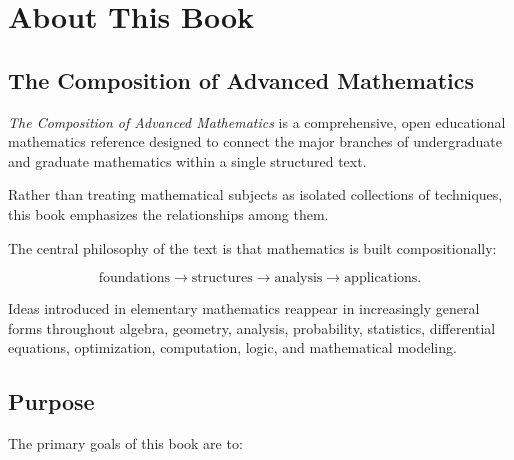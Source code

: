 
\cleardoublepage

\chapter*{About This Book}
\label{chap:about-this-book}



\section*{The Composition of Advanced Mathematics}

\emph{The Composition of Advanced Mathematics} is a comprehensive,
open educational mathematics reference designed to connect the major
branches of undergraduate and graduate mathematics within a single
structured text.

Rather than treating mathematical subjects as isolated collections of
techniques, this book emphasizes the relationships among them.

The central philosophy of the text is that mathematics is built
compositionally:

\[
\boxed{
\text{foundations}
\longrightarrow
\text{structures}
\longrightarrow
\text{analysis}
\longrightarrow
\text{applications}.
}
\]

Ideas introduced in elementary mathematics reappear in increasingly
general forms throughout algebra, geometry, analysis, probability,
statistics, differential equations, optimization, computation, logic,
and mathematical modeling.

\section*{Purpose}

The primary goals of this book are to:


